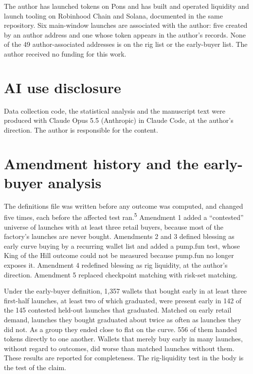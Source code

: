 \documentclass{ledger}
\newcommand{\n}[1]{\textsuperscript{#1}}
\begin{document}
The author has launched tokens on Pons and has built and operated liquidity and launch tooling on Robinhood Chain and Solana, documented in the same repository. Six main-window launches are associated with the author: five created by an author address and one whose token appears in the author's records. None of the 49 author-associated addresses is on the rig list or the early-buyer list. The author received no funding for this work.

\section{AI use disclosure}\label{ai}

Data collection code, the statistical analysis and the manuscript text were produced with Claude Opus 5.5 (Anthropic) in Claude Code, at the author's direction. The author is responsible for the content.

\appendix

\section{Amendment history and the early-buyer analysis}\label{appendix-a}

The definitions file was written before any outcome was computed, and changed five times, each before the affected test ran.\n{5} Amendment 1 added a ``contested'' universe of launches with at least three retail buyers, because most of the factory's launches are never bought. Amendments 2 and 3 defined blessing as early curve buying by a recurring wallet list and added a pump.fun test, whose King of the Hill outcome could not be measured because pump.fun no longer exposes it. Amendment 4 redefined blessing as rig liquidity, at the author's direction. Amendment 5 replaced checkpoint matching with risk-set matching.

Under the early-buyer definition, 1,357 wallets that bought early in at least three first-half launches, at least two of which graduated, were present early in 142 of the 145 contested held-out launches that graduated. Matched on early retail demand, launches they bought graduated about twice as often as launches they did not. As a group they ended close to flat on the curve. 556 of them handed tokens directly to one another. Wallets that merely buy early in many launches, without regard to outcomes, did worse than matched launches without them. These results are reported for completeness. The rig-liquidity test in the body is the test of the claim.
\end{document}
